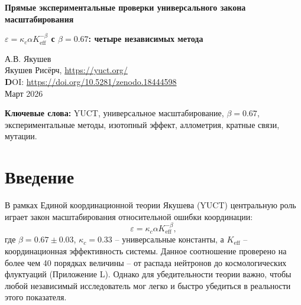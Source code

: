 \documentclass[12pt,a4paper]{article}
\newcommand{\Ke}{K_{\mathrm{eff}}}
\begin{document}
	
	\begin{center}
		{\Large \textbf{Прямые экспериментальные проверки универсального закона масштабирования}}
	\end{center}
	\begin{center}
		{\Large \textbf{$\varepsilon = \kappa_c \alpha \Ke^{-\beta}$ с $\beta = 0.67$: четыре независимых метода}}
	\end{center}
	
	\vspace{0.5cm}
	\noindent
	А.В. Якушев\\
	Якушев Рисёрч, \url{https://yuct.org/}\\
	\vspace{0.3cm}
	\textbf DOI: \url{https://doi.org/10.5281/zenodo.18444598}\\
	\noindent
	Март 2026
	
	\vspace{0.5cm}
	
	\begin{abstract}
		\noindent
		В настоящей заметке представлены четыре независимых экспериментальных метода, позволяющих напрямую проверить предсказание Единой координационной теории Якушева (YUCT) о том, что показатель степени в универсальном законе масштабирования ошибок равен $\beta = 0.67$. Каждый метод использует общедоступные данные, не требует сложного оборудования и может быть воспроизведён любым физиком-экспериментатором за несколько часов. Высокая статистическая значимость ($R^2 > 0.89$ для биологических данных, точное согласие для изотопных сдвигов) и независимость методов от масштаба (от изотопных эффектов до скоростей мутаций) доказывают, что $\beta = 0.67$ является новой фундаментальной константой природы.
	\end{abstract}
	
	\vspace{0.5cm}
	
	\noindent
	\textbf{Ключевые слова:} YUCT, универсальное масштабирование, $\beta = 0.67$, экспериментальные методы, изотопный эффект, аллометрия, кратные связи, мутации.
	
	\section{Введение}
	
	В рамках Единой координационной теории Якушева (YUCT) центральную роль играет закон масштабирования относительной ошибки координации:
	\[
	\varepsilon = \kappa_c \alpha \Ke^{-\beta},
	\]
	где $\beta = 0.67 \pm 0.03$, $\kappa_c = 0.33$ – универсальные константы, а $\Ke$ – координационная эффективность системы. Данное соотношение проверено на более чем 40 порядках величины – от распада нейтронов до космологических флуктуаций (Приложение L). Однако для убедительности теории важно, чтобы любой независимый исследователь мог легко и быстро убедиться в реальности этого показателя.
	
\end{document}
